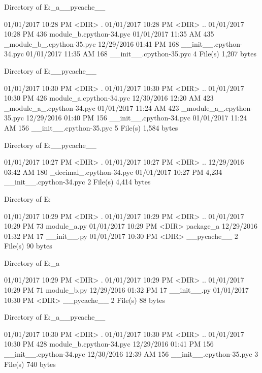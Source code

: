  Directory of E:\Python\apeman\complex\overlay\tiers\package_a\__pycache__

01/01/2017  10:28 PM    <DIR>          .
01/01/2017  10:28 PM    <DIR>          ..
01/01/2017  10:28 PM               436 module_b.cpython-34.pyc
01/01/2017  11:35 AM               435 _module_b_.cpython-35.pyc
12/29/2016  01:41 PM               168 __init__.cpython-34.pyc
01/01/2017  11:35 AM               168 __init__.cpython-35.pyc
               4 File(s)          1,207 bytes

 Directory of E:\Python\apeman\complex\overlay\tiers\__pycache__

01/01/2017  10:30 PM    <DIR>          .
01/01/2017  10:30 PM    <DIR>          ..
01/01/2017  10:30 PM               426 module_a.cpython-34.pyc
12/30/2016  12:20 AM               423 _module_a_.cpython-34.pyc
01/01/2017  11:24 AM               423 _module_a_.cpython-35.pyc
12/29/2016  01:40 PM               156 __init__.cpython-34.pyc
01/01/2017  11:24 AM               156 __init__.cpython-35.pyc
               5 File(s)          1,584 bytes

 Directory of E:\Python\apeman\complex\overlay\__pycache__

01/01/2017  10:27 PM    <DIR>          .
01/01/2017  10:27 PM    <DIR>          ..
12/29/2016  03:42 AM               180 _decimal_.cpython-34.pyc
01/01/2017  10:27 PM             4,234 __init__.cpython-34.pyc
               2 File(s)          4,414 bytes

 Directory of E:\Python\apeman\complex\tiers

01/01/2017  10:29 PM    <DIR>          .
01/01/2017  10:29 PM    <DIR>          ..
01/01/2017  10:29 PM                73 module_a.py
01/01/2017  10:29 PM    <DIR>          package_a
12/29/2016  01:32 PM                17 __init__.py
01/01/2017  10:30 PM    <DIR>          __pycache__
               2 File(s)             90 bytes

 Directory of E:\Python\apeman\complex\tiers\package_a

01/01/2017  10:29 PM    <DIR>          .
01/01/2017  10:29 PM    <DIR>          ..
01/01/2017  10:29 PM                71 module_b.py
12/29/2016  01:32 PM                17 __init__.py
01/01/2017  10:30 PM    <DIR>          __pycache__
               2 File(s)             88 bytes

 Directory of E:\Python\apeman\complex\tiers\package_a\__pycache__

01/01/2017  10:30 PM    <DIR>          .
01/01/2017  10:30 PM    <DIR>          ..
01/01/2017  10:30 PM               428 module_b.cpython-34.pyc
12/29/2016  01:41 PM               156 __init__.cpython-34.pyc
12/30/2016  12:39 AM               156 __init__.cpython-35.pyc
               3 File(s)            740 bytes

